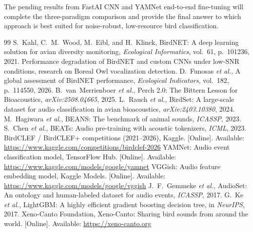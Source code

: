 \documentclass[conference]{IEEEtran}
\begin{document}
The pending results from FastAI CNN and YAMNet end-to-end fine-tuning will complete the three-paradigm comparison and provide the final answer to which approach is best suited for noise-robust, low-resource bird classification.


\begin{thebibliography}{99}
S.~Kahl, C.~M.~Wood, M.~Eibl, and H.~Klinck, BirdNET: A deep learning solution for avian diversity monitoring, \emph{Ecological Informatics}, vol.~61, p.~101236, 2021.
Performance degradation of BirdNET and custom CNNs under low-SNR conditions, research on Boreal Owl vocalization detection.
D.~Funosas \emph{et al.}, A global assessment of BirdNET performance, \emph{Ecological Indicators}, vol.~182, p.~114550, 2026.
B.~van~Merrienboer \emph{et al.}, Perch 2.0: The Bittern Lesson for Bioacoustics, \emph{arXiv:2508.04665}, 2025.
L.~Rauch \emph{et al.}, BirdSet: A large-scale dataset for audio classification in avian bioacoustics, \emph{arXiv:2403.10380}, 2024.
M.~Hagiwara \emph{et al.}, BEANS: The benchmark of animal sounds, \emph{ICASSP}, 2023.
S.~Chen \emph{et al.}, BEATs: Audio pre-training with acoustic tokenizers, \emph{ICML}, 2023.
BirdCLEF / BirdCLEF+ competitions (2021--2026), Kaggle. [Online]. Available: \url{https://www.kaggle.com/competitions/birdclef-2026}
YAMNet: Audio event classification model, TensorFlow Hub. [Online]. Available: \url{https://www.kaggle.com/models/google/yamnet}
VGGish: Audio feature embedding model, Kaggle Models. [Online]. Available: \url{https://www.kaggle.com/models/google/vggish}
J.~F.~Gemmeke \emph{et al.}, AudioSet: An ontology and human-labeled dataset for audio events, \emph{ICASSP}, 2017.
G.~Ke \emph{et al.}, LightGBM: A highly efficient gradient boosting decision tree, in \emph{NeurIPS}, 2017.
Xeno-Canto Foundation, Xeno-Canto: Sharing bird sounds from around the world. [Online]. Available: \url{https://xeno-canto.org}
\end{thebibliography}
\end{document}
